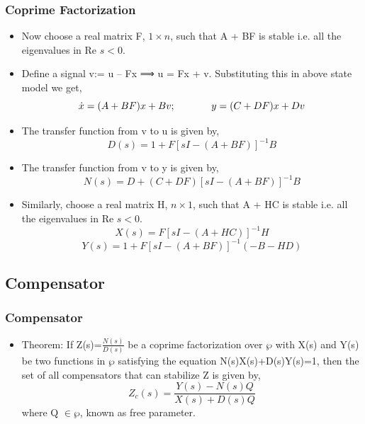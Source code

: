 \documentclass{beamer}
\begin{document}
\begin{frame}
\frametitle{Coprime Factorization}

\begin{small}
        \begin{itemize}
\item Now choose a real matrix F, $1 \times n$, such that A + BF is stable i.e. all the eigenvalues in Re $s < 0$.
\item Define a signal v:= u – Fx ⟹ u = Fx + v. Substituting this in above state model we get,
\begin{equation}
\dot{x}=(A+BF)x+Bv; \hspace{.5in} y=(C+DF)x+Dv
\end{equation}
\item The transfer function from v to u is given by, 
\begin{equation}
D(s)=1+F[sI-(A+BF)]^{-1}B
\end{equation}
\item The transfer function from v to y is given by, 
\begin{equation}
N(s)=D+(C+DF)[sI-(A+BF)]^{-1}B
\end{equation}

\item Similarly, choose a real matrix H, $n \times 1$, such that A + HC is stable i.e. all the eigenvalues in Re $ s < 0$.
\begin{equation}
X(s)=F[sI-(A+HC)]^{-1}H
\end{equation}
\begin{equation}
Y(s)=1+F[sI-(A+BF)]^{-1}(-B-HD)
\end{equation}
\end{itemize}
\end{small}
\end{frame}


\subsection*{Compensator}

\begin{frame}
\frametitle{Compensator }

\begin{small}
        \begin{itemize}
	\item Theorem: If Z(s)=$\frac{N(s)}{D(s)}$ be a coprime factorization over $\wp$ with X(s) and Y(s) be two functions in $\wp$ satisfying the equation N(s)X(s)+D(s)Y(s)=1, then the set of all compensators that can stabilize Z is given by,
\begin{equation}
Z_c(s)=\frac{Y(s)-N(s)Q}{X(s)+D(s)Q}
\end{equation}
 where Q $\in \wp$, known as free parameter.
\end{itemize}
\end{small}
\end{frame}
	
\end{document}
